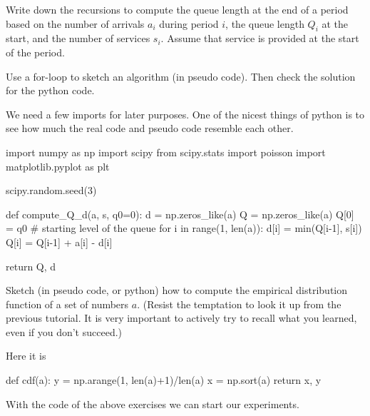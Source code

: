 \documentclass{scrartcl}
\begin{document}
\begin{exercise}
Write down the recursions to compute the queue length at the end of a period based on the number of arrivals $a_i$ during  period $i$, the queue length $Q_i$ at the start, and the number of services $s_i$. Assume that service is provided at the start of the period.  

Use a for-loop to sketch an algorithm (in pseudo code). Then check the solution for the python code.

  \begin{solution}
We need a few imports for later purposes.   One of the nicest things of python is to see how much the real code and pseudo code resemble each other.

\begin{pyblock}
import numpy as np
import scipy
from scipy.stats import poisson
import matplotlib.pyplot as plt

scipy.random.seed(3) 


def compute_Q_d(a, s, q0=0):
    d = np.zeros_like(a)
    Q = np.zeros_like(a)
    Q[0] = q0 # starting level of the queue
    for i in range(1, len(a)):
        d[i] = min(Q[i-1], s[i])
        Q[i] = Q[i-1] + a[i] - d[i]

    return Q, d
  
\end{pyblock}

  \end{solution}
  
\end{exercise}

\begin{exercise}
  Sketch (in pseudo code, or python) how to compute the empirical distribution function of a set of numbers $a$. (Resist the temptation to look it up from the previous tutorial. It is very important to actively try to recall what you learned, even if you don't succeed.)
  \begin{solution}
Here it is
\begin{pyblock}
def cdf(a):
    y = np.arange(1, len(a)+1)/len(a)
    x = np.sort(a)
    return x, y
  
\end{pyblock}
  \end{solution}
\end{exercise}

With the code of the above exercises we can start our experiments.
\end{document}
